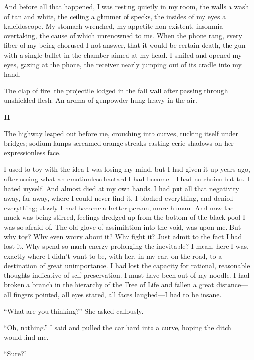 And before all that happened, I was resting quietly in my room, the
walls a wash of tan and white, the ceiling a glimmer of specks, the
insides of my eyes a kaleidoscope. My stomach wrenched, my appetite
non-existent, insomnia overtaking, the cause of which unrenowned to me.
When the phone rang, every fiber of my being chorused I not answer, that
it would be certain death, the gun with a single bullet in the chamber
aimed at my head. I smiled and opened my eyes, gazing at the phone, the
receiver nearly jumping out of its cradle into my hand.

The clap of fire, the projectile lodged in the fall wall after passing
through unshielded flesh. An aroma of gunpowder hung heavy in the air.

\textbf{II}

The highway leaped out before me, crouching into curves, tucking itself
under bridges; sodium lamps screamed orange streaks casting eerie
shadows on her expressionless face.

I used to toy with the idea I was losing my mind, but I had given it up
years ago, after seeing what an emotionless bastard I had become---I had
no choice but to. I hated myself. And almost died at my own hands. I had
put all that negativity away, far away, where I could never find it. I
blocked everything, and denied everything; slowly I had become a better
person, more human. And now the muck was being stirred, feelings dredged
up from the bottom of the black pool I was so afraid of. The old glove
of assimilation into the void, was upon me. But why toy? Why even worry
about it? Why fight it? Just admit to the fact I had lost it. Why spend
so much energy prolonging the inevitable? I mean, here I was, exactly
where I didn't want to be, with her, in my car, on the road, to a
destination of great unimportance. I had lost the capacity for rational,
reasonable thoughts indicative of self-preservation. I must have been
out of my noodle. I had broken a branch in the hierarchy of the Tree of
Life and fallen a great distance---all fingers pointed, all eyes stared,
all faces laughed---I had to be insane.

``What are you thinking?'' She asked callously.

``Oh, nothing.'' I said and pulled the car hard into a curve, hoping the
ditch would find me.

``Sure?''

